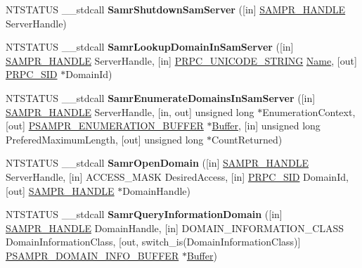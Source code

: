 \begin{DoxyCompactItemize}
\item 
\mbox{\label{interfacesamr_a5116e754bc8176ddfbe948c69181aff9}} 
N\+T\+S\+T\+A\+T\+US \+\_\+\+\_\+stdcall {\bfseries Samr\+Shutdown\+Sam\+Server} (\mbox{[}in\mbox{]} \hyperlink{interfacevoid}{S\+A\+M\+P\+R\+\_\+\+H\+A\+N\+D\+LE} Server\+Handle)
\item 
\mbox{\label{interfacesamr_ae36187ef786b7a6bd5e391787cce06c0}} 
N\+T\+S\+T\+A\+T\+US \+\_\+\+\_\+stdcall {\bfseries Samr\+Lookup\+Domain\+In\+Sam\+Server} (\mbox{[}in\mbox{]} \hyperlink{interfacevoid}{S\+A\+M\+P\+R\+\_\+\+H\+A\+N\+D\+LE} Server\+Handle, \mbox{[}in\mbox{]} \hyperlink{struct___r_p_c___u_n_i_c_o_d_e___s_t_r_i_n_g}{P\+R\+P\+C\+\_\+\+U\+N\+I\+C\+O\+D\+E\+\_\+\+S\+T\+R\+I\+NG} \hyperlink{struct_name_rec__}{Name}, \mbox{[}out\mbox{]} \hyperlink{struct___r_p_c___s_i_d}{P\+R\+P\+C\+\_\+\+S\+ID} $\ast$Domain\+Id)
\item 
\mbox{\label{interfacesamr_ab65a38de91f99bd956b019a3db39c17a}} 
N\+T\+S\+T\+A\+T\+US \+\_\+\+\_\+stdcall {\bfseries Samr\+Enumerate\+Domains\+In\+Sam\+Server} (\mbox{[}in\mbox{]} \hyperlink{interfacevoid}{S\+A\+M\+P\+R\+\_\+\+H\+A\+N\+D\+LE} Server\+Handle, \mbox{[}in, out\mbox{]} unsigned long $\ast$Enumeration\+Context, \mbox{[}out\mbox{]} \hyperlink{struct___s_a_m_p_r___e_n_u_m_e_r_a_t_i_o_n___b_u_f_f_e_r}{P\+S\+A\+M\+P\+R\+\_\+\+E\+N\+U\+M\+E\+R\+A\+T\+I\+O\+N\+\_\+\+B\+U\+F\+F\+ER} $\ast$\hyperlink{class_buffer}{Buffer}, \mbox{[}in\mbox{]} unsigned long Prefered\+Maximum\+Length, \mbox{[}out\mbox{]} unsigned long $\ast$Count\+Returned)
\item 
\mbox{\label{interfacesamr_ae012e2ef6be2596f4b8c079370d5328f}} 
N\+T\+S\+T\+A\+T\+US \+\_\+\+\_\+stdcall {\bfseries Samr\+Open\+Domain} (\mbox{[}in\mbox{]} \hyperlink{interfacevoid}{S\+A\+M\+P\+R\+\_\+\+H\+A\+N\+D\+LE} Server\+Handle, \mbox{[}in\mbox{]} A\+C\+C\+E\+S\+S\+\_\+\+M\+A\+SK Desired\+Access, \mbox{[}in\mbox{]} \hyperlink{struct___r_p_c___s_i_d}{P\+R\+P\+C\+\_\+\+S\+ID} Domain\+Id, \mbox{[}out\mbox{]} \hyperlink{interfacevoid}{S\+A\+M\+P\+R\+\_\+\+H\+A\+N\+D\+LE} $\ast$Domain\+Handle)
\item 
\mbox{\label{interfacesamr_a04772020c87e750d7cd5c1901fd84a39}} 
N\+T\+S\+T\+A\+T\+US \+\_\+\+\_\+stdcall {\bfseries Samr\+Query\+Information\+Domain} (\mbox{[}in\mbox{]} \hyperlink{interfacevoid}{S\+A\+M\+P\+R\+\_\+\+H\+A\+N\+D\+LE} Domain\+Handle, \mbox{[}in\mbox{]} D\+O\+M\+A\+I\+N\+\_\+\+I\+N\+F\+O\+R\+M\+A\+T\+I\+O\+N\+\_\+\+C\+L\+A\+SS Domain\+Information\+Class, \mbox{[}out, switch\+\_\+is(Domain\+Information\+Class)\mbox{]} \hyperlink{union___s_a_m_p_r___d_o_m_a_i_n___i_n_f_o___b_u_f_f_e_r}{P\+S\+A\+M\+P\+R\+\_\+\+D\+O\+M\+A\+I\+N\+\_\+\+I\+N\+F\+O\+\_\+\+B\+U\+F\+F\+ER} $\ast$\hyperlink{class_buffer}{Buffer})

\end{DoxyCompactItemize}
